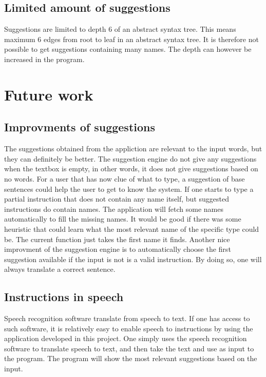 \subsection{Limited amount of suggestions}
Suggestions are limited to depth 6 of an abstract syntax tree. This means maximum 6 edges from root to leaf in an abstract syntax tree. It is therefore not possible to get suggestions containing many names. The depth can however be increased in the program.

\section{Future work}
\subsection{Improvments of suggestions}
The suggestions obtained from the appliction are relevant to the input words, but they can definitely be better. The suggestion engine do not give any suggestions when the textbox is empty, in other words, it does not give suggestions based on no words. For a user that has now clue of what to type, a suggestion of base sentences could help the user to get to know the system.
\newline
\newline
If one starts to type a partial instruction that does not contain any name itself, but suggested instructions do contain names. The application will fetch some names automatically to fill the missing names. It would be good if there was some heuristic that could learn what the most relevant name of the specific type could be. The current function just takes the first name it finds.
\newline
\newline
Another nice improvment of the suggestion engine is to automatically choose the first suggestion available if the input is not is a valid instruction. By doing so, one will always translate a correct sentence.

\subsection{Instructions in speech}
Speech recognition software translate from speech to text. If one has access to such software, it is relatively easy to enable speech to instructions by using the application developed in this project. One simply uses the speech recognition software to translate speech to text, and then take the text and use as input to the program. The program will show the most relevant suggestions based on the input.

